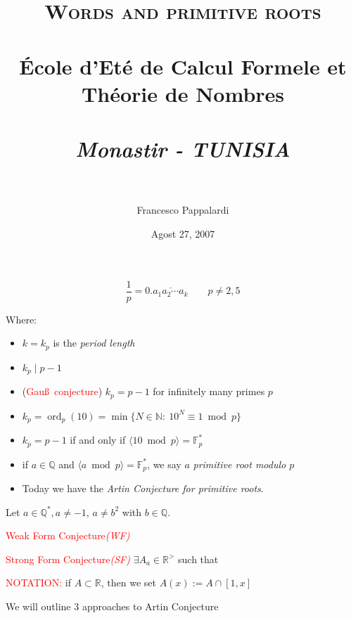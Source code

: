 \documentclass[landscape]{powersem} %
\title{\vspace*{.2cm} \ %
\ \\ \textcolor{underlcolor}{\textsc{Words and primitive roots}} \\ \ \\
\'Ecole d'Et\'e de Calcul Formele et Th\'eorie de Nombres\\
\ \\
\emph{\textit{Monastir - TUNISIA} \\
\ }}
\author{\textcolor{Emerald}{Francesco Pappalardi}\\
}
\date{\textcolor{BurntOrange}{Agost 27, 2007}}
\newcommand{\F}{{\mathbb{F}}}
\newcommand{\R}{{\mathbb R}}
\newcommand{\Q}{{{\mathbb Q}}}
\newcommand{\N}{{\mathbb N}}
\newcommand{\ord}{\operatorname{ord}}
\newcommand{\matitablu}{\textcolor{MidnightBlue}{\ding{46}}}
\newcommand{\heading}[1]{%
 \begin{center}
  \large\bf
  \shadowbox{{\textcolor{conceptcolor}{#1}}}%
 \end{center}
 \vspace{1ex minus 1ex}}
\begin{document}
\begin{slide}\pagestyle{empty}
\maketitle
\end{slide}

\begin{slide}
\heading{Introduction: Gau\ss\ Conjecture}\pause\vspace{-2mm}

$$\frac1p=0.\overline{a_1a_2\cdots a_k}\qquad p\neq 2,5$$
\pause

\noindent\textcolor{BurntOrange}{Where:}\pause\vspace{-2mm}
\begin{itemize}
\item[\matitablu] $k=k_p$ is the \emph{period length}\pause
\item[\matitablu] $k_p\mid p-1$\pause
\item[\matitablu] (\textcolor{red}{Gau\ss\ conjecture}) $k_p=p-1$ for infinitely many primes $p$\pause
\item[\matitablu] $k_p=\ord_p(10)=\min\{N\in\N:\ 10^N\equiv 1\bmod p\}$\pause
\item[\matitablu] $k_p=p-1$ if and only if $\langle 10\bmod p\rangle=\F_p^*$\pause
\item[\matitablu] if $a\in\Q$ and $\langle a\bmod p\rangle=\F_p^*$, we say $a$
\emph{primitive root modulo $p$}\pause
\item[\matitablu] Today we have the \emph{Artin Conjecture for primitive roots}.
\end{itemize}
\vfill
\end{slide}

\begin{slide}
\heading{Artin Conjecture}\pause

Let $a\in\Q^*, a\neq-1$, $a\neq b^2$ with $b\in\Q$.
\centerline{\shadowbox{$\displaystyle{P_a:=\{p:\ \langle a\bmod p\rangle=\F_p^*\}}$}}\pause

\textcolor{red}{Weak Form Conjecture\emph{(WF)}}
\centerline{}\pause

\textcolor{red}{Strong Form Conjecture\emph{(SF)}} $\exists A_a\in\R^>$ such that
\centerline{}\pause

\noindent \textcolor{red}{NOTATION:} if $A\subset\R$, then  we set $A(x):=A\cap[1,x]$\pause

We will outline 3 approaches to Artin Conjecture
\end{slide}
\end{document}
